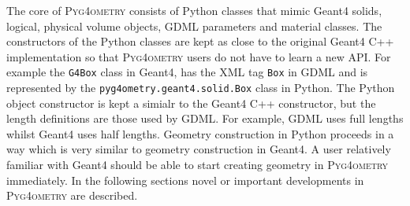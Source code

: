 \documentclass[final,5p,times,twocolumn]{elsarticle}
\newcommand{\pyinline}[1]{\lstinline[postbreak={}]{#1}}
\newcommand{\PYGEOMETRY}{\textsc{Pyg4ometry}}
\begin{document}
The core of \PYGEOMETRY{} consists of Python classes that mimic Geant4 solids, logical, physical volume objects, GDML parameters and material classes.
The constructors of the Python classes are kept as close to the original Geant4 C++ implementation so that \PYGEOMETRY{} users do not have to learn 
a new API. For example the \verb|G4Box| class in Geant4, has the XML tag \verb|Box| in GDML and is represented by the \pyinline{pyg4ometry.geant4.solid.Box} class in Python. The Python object constructor is kept a simialr to the Geant4 C++ constructor, but the length definitions are those used by GDML. For example, GDML uses full lengths whilst Geant4 uses half lengths. Geometry construction in Python proceeds in a way which is very similar to geometry construction in Geant4. A user relatively familiar with Geant4 should be able to start creating geometry in \PYGEOMETRY{} immediately. In the following sections novel or important developments in \PYGEOMETRY{} are described.  
\end{document}
